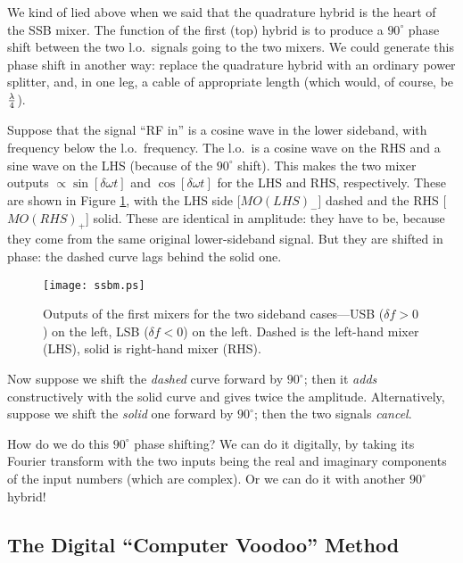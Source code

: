 \documentclass[11pt,preprint]{aastex}
\begin{document}
We kind of lied above when we said that the quadrature hybrid is the
heart of the SSB mixer. The function of the first (top) hybrid is to
produce a $90^\circ$ phase shift between the two l.o.\ signals going to
the two mixers. We could generate this phase shift in another way:
replace the quadrature hybrid with an ordinary power splitter, and, in
one leg, a cable of appropriate length (which would, of course, be
$\lambda \over 4$).

        Suppose that the signal ``RF in'' is a cosine wave in the lower
sideband, with frequency below the l.o.\ frequency. The l.o.\ is a
cosine wave on the RHS and a sine wave on the LHS (because of the
$90^\circ$ shift). This makes the two mixer outputs
$\propto \sin [\delta \omega t]$ and $\cos [\delta \omega t]$ for the
LHS and RHS, respectively. These are shown in Figure \ref{mixerout},
with the LHS side [$MO(LHS)_-$] dashed and the RHS [$MO(RHS)_+$]
solid. These are identical in amplitude: they have to be, because they
come from the same original lower-sideband signal. But they are shifted
in phase: the dashed curve lags behind the solid one.

\begin{figure}[h]
\hspace{-0.5in}
        \texttt{[image: ssbm.ps]}
        \caption{Outputs of the first mixers for the two sideband
	  cases---USB ($\delta f > 0$) on the left, LSB ($\delta f< 0$) on
	  the left.  Dashed is the left-hand mixer (LHS), solid is
	  right-hand mixer (RHS).
\label{mixerout}}
\end{figure}



        Now suppose we shift the {\it dashed} curve forward by
$90^\circ$; then it {\it adds} constructively with the solid curve and
gives twice the amplitude. Alternatively, suppose we shift the {\it
solid} one forward by $90^\circ$; then the two signals {\it cancel}.

How do we do this $90^\circ$ phase shifting? We can do it
digitally, by taking its Fourier transform with the two inputs being the
real and imaginary components of the input numbers (which are complex).
Or we can do it with another
$90^\circ$ hybrid! 

\subsection{The Digital ``Computer Voodoo'' Method}
\end{document}
